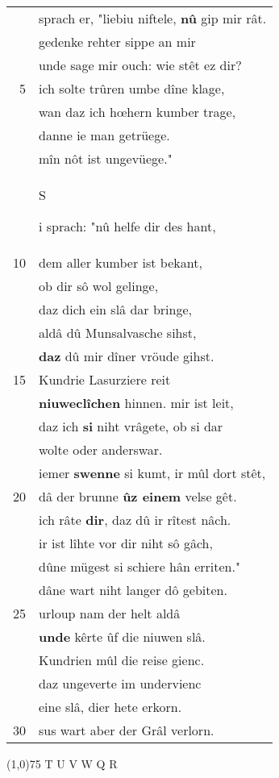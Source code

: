 \documentclass[8pt,a4paper,notitlepage]{article}
\begin{document}
\begin{table}[ht]
\begin{minipage}[t]{0.5\linewidth}
\begin{tabular}{rl}
 & sprach er, "liebiu niftele, \textbf{nû} gip mir rât.\\ 
 & gedenke rehter sippe an mir\\ 
 & unde sage mir ouch: wie stêt ez dir?\\ 
5 & ich solte trûren umbe dîne klage,\\ 
 & wan daz ich hœhern kumber trage,\\ 
 & danne ie man getrüege.\\ 
 & mîn nôt ist ungevüege."\\ 
 & \begin{large}S\end{large}i sprach: "nû helfe dir des hant,\\ 
10 & dem aller kumber ist bekant,\\ 
 & ob dir sô wol gelinge,\\ 
 & daz dich ein slâ dar bringe,\\ 
 & aldâ dû Munsalvasche sihst,\\ 
 & \textbf{daz} dû mir dîner vröude gihst.\\ 
15 & Kundrie Lasurziere reit\\ 
 & \textbf{niuweclîchen} hinnen. mir ist leit,\\ 
 & daz ich \textbf{si} niht vrâgete, ob si dar\\ 
 & wolte oder anderswar.\\ 
 & iemer \textbf{swenne} si kumt, ir mûl dort stêt,\\ 
20 & dâ der brunne \textbf{ûz einem} velse gêt.\\ 
 & ich râte \textbf{dir}, daz dû ir rîtest nâch.\\ 
 & ir ist lîhte vor dir niht sô gâch,\\ 
 & dûne mügest si schiere hân erriten."\\ 
 & dâne wart niht langer dô gebiten.\\ 
25 & urloup nam der helt aldâ\\ 
 & \textbf{unde} kêrte ûf die niuwen slâ.\\ 
 & Kundrien mûl die reise gienc.\\ 
 & daz ungeverte im undervienc\\ 
 & eine slâ, dier hete erkorn.\\ 
30 & sus wart aber der Grâl verlorn.\\ 
\end{tabular}
\scriptsize
\line(1,0){75} \newline
T U V W Q R \newline

\end{minipage}
\end{table}
\end{document}
